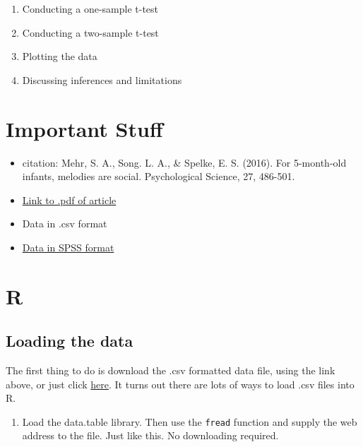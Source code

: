 \documentclass[
]{book}
\providecommand{\tightlist}{%
  \setlength{\itemsep}{0pt}\setlength{\parskip}{0pt}}
\begin{document}
\begin{enumerate}
\def\labelenumi{\arabic{enumi}.}
\tightlist
\item
  Conducting a one-sample t-test
\item
  Conducting a two-sample t-test
\item
  Plotting the data
\item
  Discussing inferences and limitations
\end{enumerate}

\hypertarget{important-stuff}{%
\section{Important Stuff}\label{important-stuff}}

\begin{itemize}
\tightlist
\item
  citation: Mehr, S. A., Song. L. A., \& Spelke, E. S. (2016). For 5-month-old infants, melodies are social. Psychological Science, 27, 486-501.
\item
  \href{http://journals.sagepub.com/stoken/default+domain/d5HcBHg85XamSXGdYqYN/full}{Link to .pdf of article}
\item
  Data in .csv format
\item
  \href{https://drive.google.com/open?id=0Bz-rhZ21ShvOa3c4X3hqOWxwcUU}{Data in SPSS format}
\end{itemize}

\hypertarget{r-6}{%
\section{R}\label{r-6}}

\hypertarget{loading-the-data}{%
\subsection{Loading the data}\label{loading-the-data}}

The first thing to do is download the .csv formatted data file, using the link above, or just click \href{https://drive.google.com/open?id=0Bz-rhZ21ShvOdW1wV0pmUTJSSk0}{here}. It turns out there are lots of ways to load .csv files into R.

\begin{enumerate}
\def\labelenumi{\arabic{enumi}.}
\tightlist
\item
  Load the data.table library. Then use the \texttt{fread} function and supply the web address to the file. Just like this. No downloading required.
\end{enumerate}
\end{document}
